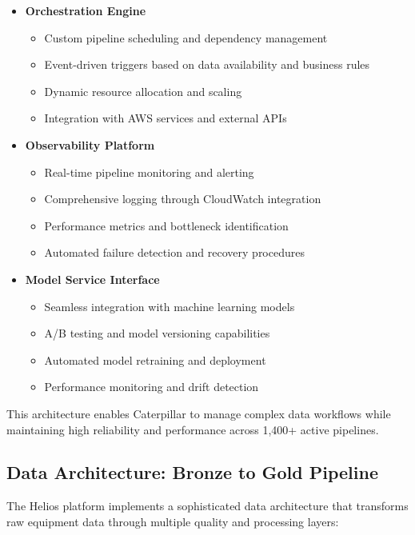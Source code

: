 \documentclass[12pt, a4paper]{article} %
\begin{document}
\begin{itemize}
    \item \textbf{Orchestration Engine}
    \begin{itemize}
        \item Custom pipeline scheduling and dependency management
        \item Event-driven triggers based on data availability and business rules
        \item Dynamic resource allocation and scaling
        \item Integration with AWS services and external APIs
    \end{itemize}
    
    \item \textbf{Observability Platform}
    \begin{itemize}
        \item Real-time pipeline monitoring and alerting
        \item Comprehensive logging through CloudWatch integration
        \item Performance metrics and bottleneck identification
        \item Automated failure detection and recovery procedures
    \end{itemize}
    
    \item \textbf{Model Service Interface}
    \begin{itemize}
        \item Seamless integration with machine learning models
        \item A/B testing and model versioning capabilities
        \item Automated model retraining and deployment
        \item Performance monitoring and drift detection
    \end{itemize}
\end{itemize}

This architecture enables Caterpillar to manage complex data workflows while maintaining high reliability and performance across 1,400+ active pipelines.

\subsection{Data Architecture: Bronze to Gold Pipeline}

The Helios platform implements a sophisticated data architecture that transforms raw equipment data through multiple quality and processing layers:
\end{document}
